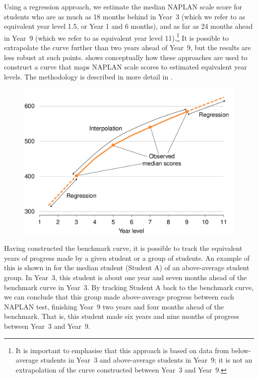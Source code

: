 Using a regression approach, we estimate the median NAPLAN scale score for students who are as much as 18 months behind in \mbox{Year 3} (which we refer to as equivalent year level 1.5, or Year 1 and 6 months), and as far as 24 months ahead in \mbox{Year 9} (which we refer to as equivalent year level 11).\footnote{It is important to emphasise that this approach is based on data from below-average students in \mbox{Year 3} and above-average students in \mbox{Year 9}; it is not an extrapolation of the curve constructed between \mbox{Year 3} and \mbox{Year 9}.} It is possible to extrapolate the curve further than two years ahead of \mbox{Year 9}, but the results are less robust at such points.  shows conceptually how these approaches are used to construct a curve that maps NAPLAN scale scores to estimated equivalent year levels. The methodology is described in more detail in .

\begin{figure}[H]
 \includegraphics[width=\columnwidth]{atlas/CYL_n.pdf}\label{fig:cyl_n}

\end{figure}

\newpage
Having constructed the benchmark curve, it is possible to track the equivalent years of progress made by a given student or a group of students. An example of this is shown in  for the median student (Student A) of an above-average student group. In \mbox{Year 3}, this student is about one year and seven months ahead of the benchmark curve in \mbox{Year 3}. By tracking Student A back to the benchmark curve, we can conclude that this group made above-average progress between each NAPLAN test, finishing \mbox{Year 9} two years and four months ahead of the benchmark. That is, this student made six years and nine months of progress between \mbox{Year 3} and \mbox{Year 9}.

